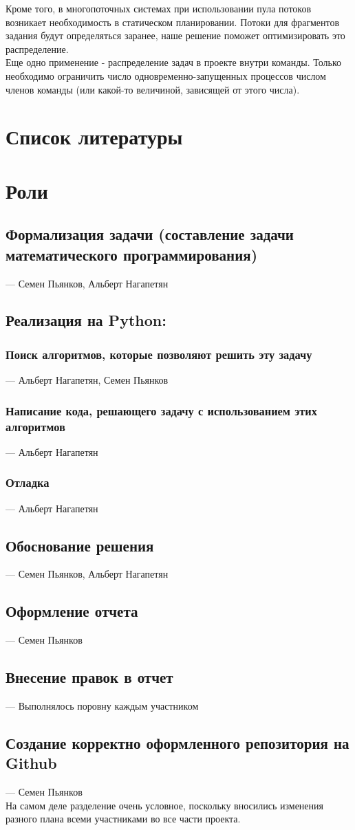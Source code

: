 \documentclass{article}
\begin{document}
Кроме того, в многопоточных системах при использовании пула потоков возникает необходимость в статическом планировании. Потоки для фрагментов задания будут определяться заранее, наше решение поможет оптимизировать это распределение.\\

Еще одно применение - распределение задач в проекте внутри команды. Только необходимо ограничить число одновременно-запущенных процессов числом членов команды (или какой-то величиной, зависящей от этого числа).

\section{Список литературы}


\section{Роли}

\subsection{Формализация задачи (составление задачи математического программирования)} --- Семен Пьянков, Альберт Нагапетян
\subsection{Реализация на Python:}
    \subsubsection{Поиск алгоритмов, которые позволяют решить эту задачу} --- Альберт Нагапетян, Семен Пьянков
    \subsubsection{Написание кода, решающего задачу с использованием этих алгоритмов} --- Альберт Нагапетян
    \subsubsection{Отладка} --- Альберт Нагапетян %
\subsection{Обоснование решения} --- Семен Пьянков, Альберт Нагапетян
\subsection{Оформление отчета} --- Семен Пьянков
\subsection{Внесение правок в отчет} --- Выполнялось поровну каждым участником
\subsection{Создание корректно оформленного репозитория на Github} --- Семен Пьянков\\

На самом деле разделение очень условное, поскольку вносились изменения разного плана всеми участниками во все части проекта.\\
\end{document}
